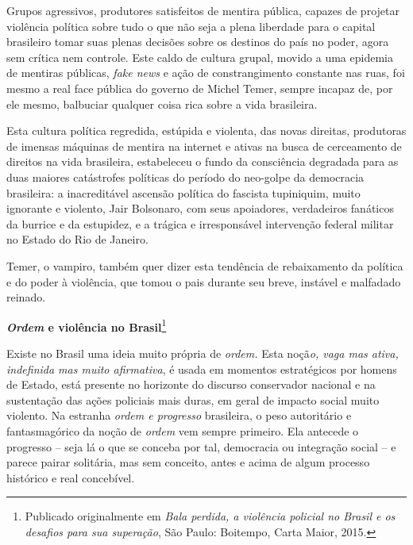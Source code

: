 Grupos agressivos, produtores satisfeitos de mentira pública, capazes de
projetar violência política sobre tudo o que não seja a plena liberdade
para o capital brasileiro tomar suas plenas decisões sobre os destinos
do país no poder, agora sem crítica nem controle. Este caldo de cultura
grupal, movido a uma epidemia de mentiras públicas, \emph{fake news} e
ação de constrangimento constante nas ruas, foi mesmo a real face
pública do governo de Michel Temer, sempre incapaz de, por ele mesmo,
balbuciar qualquer coisa rica sobre a vida brasileira.

Esta cultura política regredida, estúpida e violenta, das novas
direitas, produtoras de imensas máquinas de mentira na internet e ativas
na busca de cerceamento de direitos na vida brasileira, estabeleceu o
fundo da consciência degradada para as duas maiores catástrofes
políticas do período do neo-golpe da democracia brasileira: a
inacreditável ascensão política do fascista tupiniquim, muito ignorante
e violento, Jair Bolsonaro, com seus apoiadores, verdadeiros fanáticos
da burrice e da estupidez, e a trágica e irresponsável intervenção
federal militar no Estado do Rio de Janeiro.

Temer, o vampiro, também quer dizer esta tendência de rebaixamento da
política e do poder à violência, que tomou o pais durante seu breve,
instável e malfadado reinado.

\textbf{\emph{Ordem} e violência no Brasil}\footnote{Publicado
  originalmente em \emph{Bala perdida, a violência policial no Brasil e
  os desafios para sua superação}, São Paulo: Boitempo, Carta Maior,
  2015.}

Existe no Brasil uma ideia muito própria de \emph{ordem.} Esta
noçã\emph{o, vaga mas ativa, indefinida mas muito afirmativa}, é usada
em momentos estratégicos por homens de Estado, está presente no
horizonte do discurso conservador nacional e na sustentação das ações
policiais mais duras, em geral de impacto social muito violento. Na
estranha \emph{ordem e progresso} brasileira, o peso autoritário e
fantasmagórico da noção de \emph{ordem} vem sempre primeiro. Ela
antecede o progresso -- seja lá o que se conceba por tal, democracia ou
integração social -- e parece pairar solitária, mas sem conceito, antes
e acima de algum processo histórico e real concebível.

